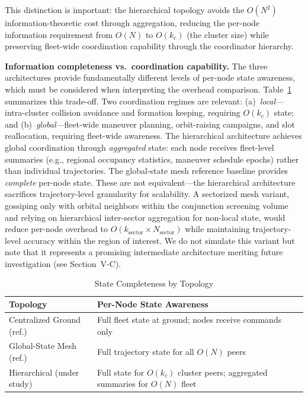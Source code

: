 \documentclass[journal]{IEEEtran}
\begin{document}
This distinction is important: the hierarchical topology avoids the $O(N^2)$ information-theoretic cost through aggregation, reducing the per-node information requirement from $O(N)$ to $O(k_c)$ (the cluster size) while preserving fleet-wide coordination capability through the coordinator hierarchy.

\textbf{Information completeness vs.\ coordination capability.} The three architectures provide fundamentally different levels of per-node state awareness, which must be considered when interpreting the overhead comparison. Table~\ref{tab:state_completeness} summarizes this trade-off. Two coordination regimes are relevant: (a)~\emph{local}---intra-cluster collision avoidance and formation keeping, requiring $O(k_c)$ state; and (b)~\emph{global}---fleet-wide maneuver planning, orbit-raising campaigns, and slot reallocation, requiring fleet-wide awareness. The hierarchical architecture achieves global coordination through \emph{aggregated} state: each node receives fleet-level summaries (e.g., regional occupancy statistics, maneuver schedule epochs) rather than individual trajectories. The global-state mesh reference baseline provides \emph{complete} per-node state. These are not equivalent---the hierarchical architecture sacrifices trajectory-level granularity for scalability. A sectorized mesh variant, gossiping only with orbital neighbors within the conjunction screening volume and relying on hierarchical inter-sector aggregation for non-local state, would reduce per-node overhead to $O(k_{\text{sector}} \times N_{\text{sector}})$ while maintaining trajectory-level accuracy within the region of interest. We do not simulate this variant but note that it represents a promising intermediate architecture meriting future investigation (see Section~V-C).

\begin{table}[t]
    \centering
    \caption{State Completeness by Topology}
    \label{tab:state_completeness}
    \begin{tabular}{@{}lp{5.5cm}@{}}
        \toprule
        \textbf{Topology} & \textbf{Per-Node State Awareness} \\
        \midrule
        Centralized Ground (ref.)  & Full fleet state at ground; nodes receive commands only \\
        Global-State Mesh (ref.)   & Full trajectory state for all $O(N)$ peers \\
        Hierarchical (under study) & Full state for $O(k_c)$ cluster peers; aggregated summaries for $O(N)$ fleet \\
        \bottomrule
    \end{tabular}
\end{table}
\end{document}
